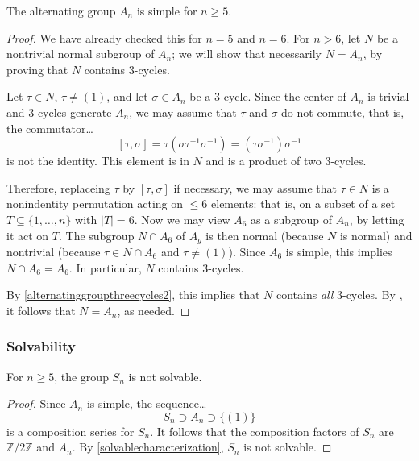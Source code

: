 \begin{theorem}
The alternating group $A_n$ is simple for $n \geq 5$.
\end{theorem}

\begin{proof}
We have already checked this for $n = 5$ and $n = 6$. For $n > 6$, let $N$ be a nontrivial normal subgroup of $A_n$; we will show that necessarily $N = A_n$, by proving that $N$ contains $3$-cycles.

Let $\tau \in N$, $\tau \neq (1)$, and let $\sigma \in A_n$ be a $3$-cycle. Since the center of $A_n$ is trivial and $3$-cycles generate $A_n$, we may assume that $\tau$ and $\sigma$ do not commute,
that is, the commutator\dots
$$[\tau, \sigma] = \tau(\sigma \tau^{-1} \sigma^{-1}) = (\tau \sigma^{-1})\sigma^{-1}$$
is not the identity. This element is in $N$ and is a product of two $3$-cycles.

Therefore, replaceing $\tau$ by $[ \tau, \sigma ]$ if necessary, we may assume that $\tau \in N$ is a nonindentity permutation acting on $\leq 6$ elements: that is, on a subset of a set
$T \subseteq \{ 1, \dots, n \}$ with $|T| = 6$. Now we may view $A_6$ as a subgroup of $A_n$, by letting it act on $T$. The subgroup $N \cap A_6$ of $A_g$ is then normal (because $N$ is normal) and
nontrivial (because $\tau \in N \cap A_6$ and $\tau \neq (1)$). Since $A_6$ is simple, this implies $N \cap A_6 = A_6$. In particular, $N$ contains $3$-cycles.

By \ref{alternatinggroupthreecycles2}, this implies that $N$ contains \emph{all} $3$-cycles. By \label{alternatinggroupthreecycles1}, it follows that $N = A_n$, as needed.
\end{proof}

\subsubsection{Solvability}\label{solvabilityalternatinggroup}

\begin{corollary}
For $n \geq 5$, the group $S_n$ is not solvable.
\end{corollary}

\begin{proof}
Since $A_n$ is simple, the sequence\dots
$$S_n \supset A_n \supset \{ (1) \}$$
is a composition series for $S_n$. It follows that the composition factors of $S_n$ are $\mathbb{Z} / 2 \mathbb{Z}$
and $A_n$. By \ref{solvablecharacterization}, $S_n$ is not solvable.
\end{proof}